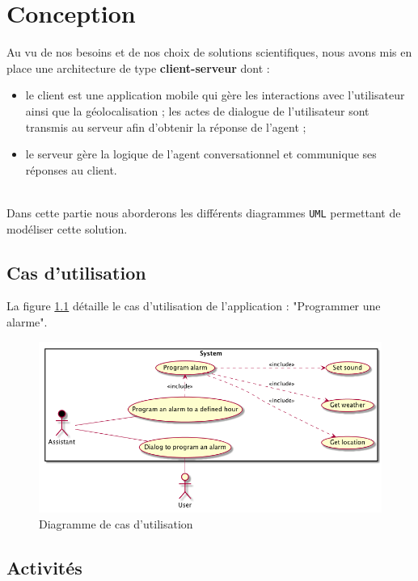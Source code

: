 \chapter{Conception}

Au vu de nos besoins et de nos choix de solutions scientifiques, nous avons mis en place une architecture de type
\textbf{client-serveur} dont :
\begin{itemize}
    \item le client est une application mobile qui gère les interactions avec l'utilisateur ainsi que la géolocalisation
    ; les actes de dialogue de l'utilisateur sont transmis au serveur afin d'obtenir la réponse de l'agent ;
    \item le serveur gère la logique de l'agent conversationnel et communique ses réponses au client.
\end{itemize}

~\\\indent
Dans cette partie nous aborderons les différents diagrammes \texttt{UML} permettant de modéliser cette solution.


\section{Cas d'utilisation}

La figure \ref{usecase-diagram} détaille le cas d'utilisation de l'application : "Programmer une alarme".

\begin{figure}[!h]
    \centering
    \includegraphics[width=\textwidth]{../docs/conception/build/usecaseDiagram.png}
    \caption{Diagramme de cas d'utilisation}
    \label{usecase-diagram}
\end{figure}


\section{Activités}

